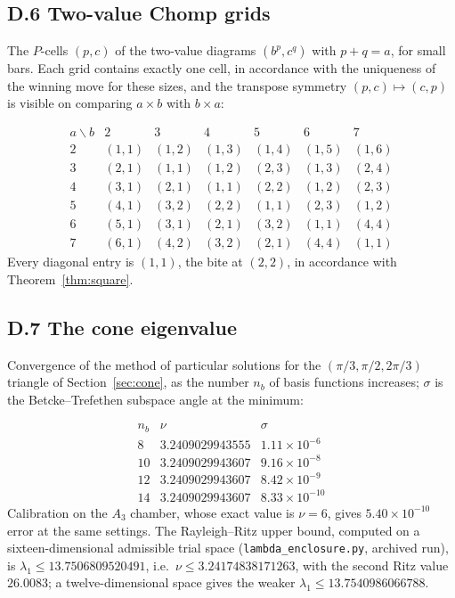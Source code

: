 \documentclass[11pt]{article}
\theoremstyle{definition}
\begin{document}
\subsection*{D.6 Two-value Chomp grids}

The $P$-cells $(p,c)$ of the two-value diagrams $(b^{p},c^{q})$ with $p+q=a$,
for small bars. Each grid contains exactly one cell, in accordance with the
uniqueness of the winning move for these sizes, and the transpose symmetry
$(p,c)\mapsto(c,p)$ is visible on comparing $a\times b$ with $b\times a$:

\[
\begin{array}{rcccccc}
a\backslash b & 2 & 3 & 4 & 5 & 6 & 7\\\hline
2 & (1,1) & (1,2) & (1,3) & (1,4) & (1,5) & (1,6)\\
3 & (2,1) & (1,1) & (1,2) & (2,3) & (1,3) & (2,4)\\
4 & (3,1) & (2,1) & (1,1) & (2,2) & (1,2) & (2,3)\\
5 & (4,1) & (3,2) & (2,2) & (1,1) & (2,3) & (1,2)\\
6 & (5,1) & (3,1) & (2,1) & (3,2) & (1,1) & (4,4)\\
7 & (6,1) & (4,2) & (3,2) & (2,1) & (4,4) & (1,1)
\end{array}
\]
Every diagonal entry is $(1,1)$, the bite at $(2,2)$, in accordance with
Theorem~\ref{thm:square}.

\subsection*{D.7 The cone eigenvalue}

Convergence of the method of particular solutions for the
$(\pi/3,\pi/2,2\pi/3)$ triangle of Section~\ref{sec:cone}, as the number
$n_b$ of basis functions increases; $\sigma$ is the Betcke--Trefethen subspace
angle at the minimum:

\[
\begin{array}{rll}
n_b & \nu & \sigma\\\hline
8 & 3.2409029943555 & 1.11\times10^{-6}\\
10 & 3.2409029943607 & 9.16\times10^{-8}\\
12 & 3.2409029943607 & 8.42\times10^{-9}\\
14 & 3.2409029943607 & 8.33\times10^{-10}
\end{array}
\]
Calibration on the $A_3$ chamber, whose exact value is $\nu=6$, gives
$5.40\times10^{-10}$ error at the same settings. The Rayleigh--Ritz upper
bound, computed on a sixteen-dimensional admissible trial space
(\texttt{lambda\_enclosure.py}, archived run), is
$\lambda_1\le13.7506809520491$, i.e.\ $\nu\le3.24174838171263$, with the second
Ritz value $26.0083$; a twelve-dimensional space gives the weaker
$\lambda_1\le13.7540986066788$.
\end{document}
